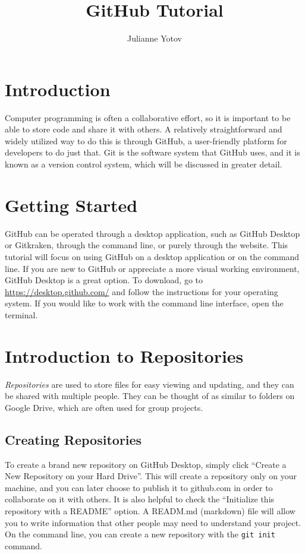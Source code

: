 \documentclass[10pt,twocolumn]{article}
\title{GitHub Tutorial}
\author{Julianne Yotov}
\affiliation{Occidental College}
\begin{document}
\maketitle

\section{Introduction}

Computer programming is often a collaborative effort, so it is important to be able to store code and share it with others. A relatively straightforward and widely utilized way to do this is through GitHub, a user-friendly platform for developers to do just that. Git is the software system that GitHub uses, and it is known as a version control system, which will be discussed in greater detail.

\section{Getting Started}

GitHub can be operated through a desktop application, such as GitHub Desktop or Gitkraken, through the command line, or purely through the website. This tutorial will focus on using GitHub on a desktop application or on the command line. If you are new to GitHub or appreciate a more visual working environment, GitHub Desktop is a great option. To download, go to \url{https://desktop.github.com/} and follow the instructions for your operating system. If you would like to work with the command line interface, open the terminal.

\section{Introduction to Repositories}

\textit{Repositories} are used to store files for easy viewing and updating, and they can be shared with multiple people. They can be thought of as similar to folders on Google Drive, which are often used for group projects. 

\subsection{Creating Repositories}

To create a brand new repository on GitHub Desktop, simply click “Create a New Repository on your Hard Drive”. This will create a repository only on your machine, and you can later choose to publish it to github.com in order to collaborate on it with others. It is also helpful to check the “Initialize this repository with a README” option. A READM.md (markdown) file will allow you to write information that other people may need to understand your project. On the command line, you can create a new repository with the \texttt{git init} command.
\end{document}
